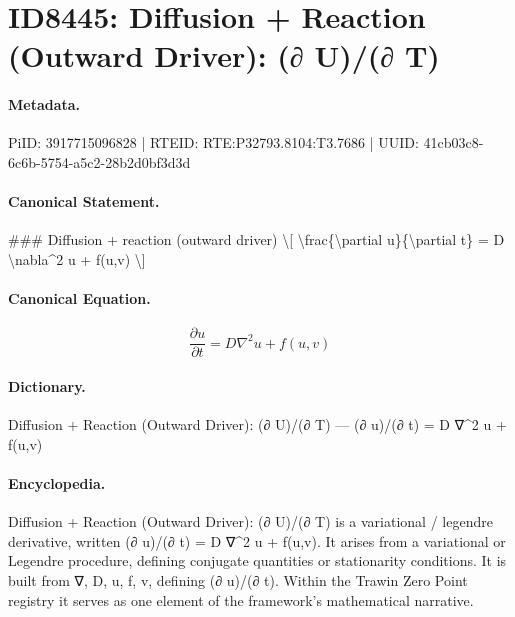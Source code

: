 \section*{ID8445: Diffusion + Reaction (Outward Driver): (∂ U)/(∂ T)}
\paragraph{Metadata.}
PiID: 3917715096828 | RTEID: RTE:P32793.8104:T3.7686 | UUID: 41cb03c8-6c6b-5754-a5c2-28b2d0bf3d3d

\paragraph{Canonical Statement.}
\#\#\# Diffusion + reaction (outward driver) \textbackslash{}[ \textbackslash{}frac\{\textbackslash{}partial u\}\{\textbackslash{}partial t\} = D \textbackslash{}nabla\textasciicircum{}2 u + f(u,v) \textbackslash{}]

\paragraph{Canonical Equation.}
\[
\frac{\partial u}{\partial t} = D \nabla^2 u + f(u,v)
\]

\paragraph{Dictionary.}
Diffusion + Reaction (Outward Driver): (∂ U)/(∂ T) — (∂ u)/(∂ t) = D ∇\textasciicircum{}2 u + f(u,v)

\paragraph{Encyclopedia.}
Diffusion + Reaction (Outward Driver): (∂ U)/(∂ T) is a variational / legendre derivative, written (∂ u)/(∂ t) = D ∇\textasciicircum{}2 u + f(u,v). It arises from a variational or Legendre procedure, defining conjugate quantities or stationarity conditions. It is built from ∇, D, u, f, v, defining (∂ u)/(∂ t). Within the Trawin Zero Point registry it serves as one element of the framework's mathematical narrative.
